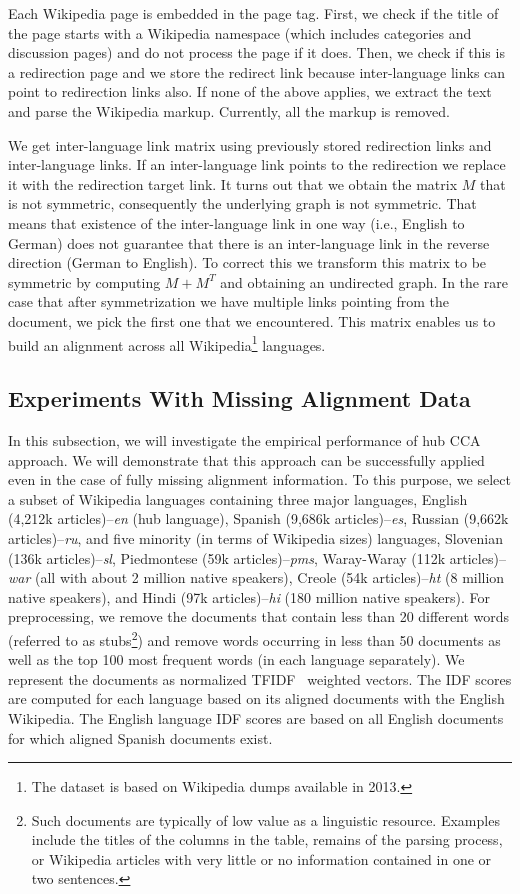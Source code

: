 \documentclass[twoside,11pt]{article}
\begin{document}
Each Wikipedia page is embedded in the page tag. First, we check if the title of the page starts with a Wikipedia namespace (which includes categories and discussion pages) and do not process the page if it does. Then, we check if this is a redirection page and we store the redirect link because inter-language links can point to redirection links also. If none of the above applies, we extract the text and parse the Wikipedia markup. Currently, all the markup is removed.

We get inter-language link matrix using previously stored redirection links and inter-language links. If an inter-language link points to the redirection we replace it with the redirection target link. It turns out that we obtain the matrix $M$ that is not symmetric, consequently the underlying graph is not symmetric. That means that existence of the inter-language link in one way (i.e., English to German) does not guarantee that there is an inter-language link in the reverse direction (German to English). To correct this we transform this matrix to be symmetric by computing $M+M^T$ and obtaining an undirected graph. In the rare case that after symmetrization we have multiple links pointing from the document, we pick the first one that we encountered. This matrix enables us to build an alignment across all Wikipedia\footnote{The dataset is based on Wikipedia dumps available in 2013.} languages.

\subsection{Experiments With Missing Alignment Data}\label{experiments:hubcca}

 In this subsection, we will investigate the empirical performance of hub CCA approach. We will demonstrate that this approach can be successfully applied even in the case of fully missing alignment information.
 To this purpose, we select a subset of Wikipedia languages containing three major languages, English (4,212k articles)--\emph{en} (hub language), Spanish (9,686k articles)--\emph{es}, Russian (9,662k articles)--\emph{ru}, and five minority (in terms of Wikipedia sizes) languages, Slovenian (136k articles)--\emph{sl}, Piedmontese (59k articles)--\emph{pms}, Waray-Waray (112k articles)--\emph{war} (all with about 2 million native speakers), Creole (54k articles)--\emph{ht} (8 million native speakers), and Hindi (97k articles)--\emph{hi} (180 million native speakers). For preprocessing, we remove the documents that contain less than 20 different words (referred to as stubs\footnote{Such documents are typically of low value as a linguistic resource. Examples include the titles of the columns in the table, remains of the parsing process, or Wikipedia articles with very little or no information contained in one or two sentences.}) and remove words occurring in less than 50 documents as well as the top 100 most frequent words (in each language separately). We represent the documents as normalized TFIDF~\cite{Salton88term-weightingapproaches} weighted vectors. The IDF scores are computed for each language based on its aligned documents with the English Wikipedia. The English language IDF scores are based on all English documents for which aligned Spanish documents exist.
\end{document}
